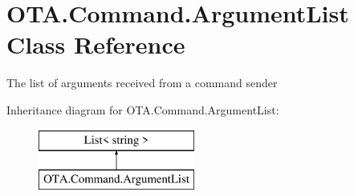 \hypertarget{class_o_t_a_1_1_command_1_1_argument_list}{}\section{O\+T\+A.\+Command.\+Argument\+List Class Reference}
\label{class_o_t_a_1_1_command_1_1_argument_list}


The list of arguments received from a command sender  


Inheritance diagram for O\+T\+A.\+Command.\+Argument\+List\+:\begin{figure}[H]
\begin{center}
\leavevmode
\includegraphics[height=2.000000cm]{class_o_t_a_1_1_command_1_1_argument_list}
\end{center}
\end{figure}
